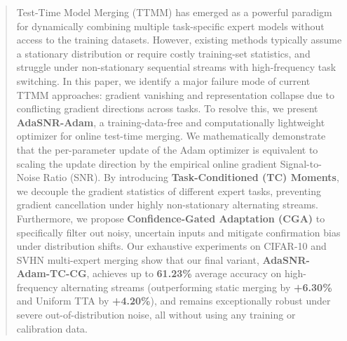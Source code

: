 \documentclass{article}
\theoremstyle{plain}
\theoremstyle{definition}
\theoremstyle{remark}
\begin{document}

\printAffiliationsAndNotice{}

\begin{abstract}
Test-Time Model Merging (TTMM) has emerged as a powerful paradigm for dynamically combining multiple task-specific expert models without access to the training datasets. However, existing methods typically assume a stationary distribution or require costly training-set statistics, and struggle under non-stationary sequential streams with high-frequency task switching. In this paper, we identify a major failure mode of current TTMM approaches: gradient vanishing and representation collapse due to conflicting gradient directions across tasks. To resolve this, we present \textbf{AdaSNR-Adam}, a training-data-free and computationally lightweight optimizer for online test-time merging. We mathematically demonstrate that the per-parameter update of the Adam optimizer is equivalent to scaling the update direction by the empirical online gradient Signal-to-Noise Ratio (SNR). By introducing \textbf{Task-Conditioned (TC) Moments}, we decouple the gradient statistics of different expert tasks, preventing gradient cancellation under highly non-stationary alternating streams. Furthermore, we propose \textbf{Confidence-Gated Adaptation (CGA)} to specifically filter out noisy, uncertain inputs and mitigate confirmation bias under distribution shifts. Our exhaustive experiments on CIFAR-10 and SVHN multi-expert merging show that our final variant, \textbf{AdaSNR-Adam-TC-CG}, achieves up to \textbf{61.23\%} average accuracy on high-frequency alternating streams (outperforming static merging by \textbf{+6.30\%} and Uniform TTA by \textbf{+4.20\%}), and remains exceptionally robust under severe out-of-distribution noise, all without using any training or calibration data.
\end{abstract}
\end{document}
